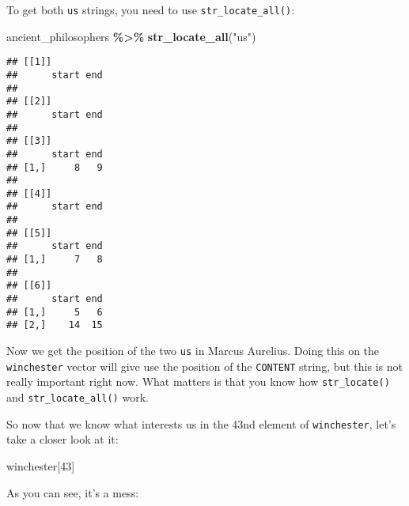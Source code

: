 \documentclass[
]{article}
\newenvironment{Shaded}{\begin{snugshade}}{\end{snugshade}}
\newcommand{\DecValTok}[1]{\textcolor[rgb]{0.00,0.00,0.81}{#1}}
\newcommand{\KeywordTok}[1]{\textcolor[rgb]{0.13,0.29,0.53}{\textbf{#1}}}
\newcommand{\NormalTok}[1]{#1}
\newcommand{\OperatorTok}[1]{\textcolor[rgb]{0.81,0.36,0.00}{\textbf{#1}}}
\newcommand{\StringTok}[1]{\textcolor[rgb]{0.31,0.60,0.02}{#1}}
\begin{document}
To get both \texttt{us} strings, you need to use \texttt{str\_locate\_all()}:

\begin{Shaded}
\begin{Highlighting}[]
\NormalTok{ancient\_philosophers }\OperatorTok{\%\textgreater{}\%}
\StringTok{  }\KeywordTok{str\_locate\_all}\NormalTok{(}\StringTok{"us"}\NormalTok{)}
\end{Highlighting}
\end{Shaded}

\begin{verbatim}
## [[1]]
##      start end
## 
## [[2]]
##      start end
## 
## [[3]]
##      start end
## [1,]     8   9
## 
## [[4]]
##      start end
## 
## [[5]]
##      start end
## [1,]     7   8
## 
## [[6]]
##      start end
## [1,]     5   6
## [2,]    14  15
\end{verbatim}

Now we get the position of the two \texttt{us} in Marcus Aurelius. Doing this on the \texttt{winchester} vector
will give use the position of the \texttt{CONTENT} string, but this is not really important right now. What
matters is that you know how \texttt{str\_locate()} and \texttt{str\_locate\_all()} work.

So now that we know what interests us in the 43nd element of \texttt{winchester}, let's take a closer
look at it:

\begin{Shaded}
\begin{Highlighting}[]
\NormalTok{winchester[}\DecValTok{43}\NormalTok{]}
\end{Highlighting}
\end{Shaded}

As you can see, it's a mess:
\end{document}
